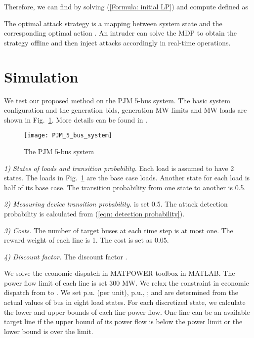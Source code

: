 \documentclass[conference,letterpaper,10pt]{IEEEtran}
\begin{document}
Therefore, we can find  by solving   (\ref{Formula: initial LP}) 
and compute  defined as 

 The optimal attack strategy is a mapping between system state  and the corresponding optimal action . An intruder can solve the MDP to obtain the strategy offline and then inject attacks accordingly in real-time operations.


\section{Simulation}\label{sec:simu}
We test our proposed method on the PJM 5-bus system. The basic system configuration and the generation bids, generation MW limits and MW loads are shown in Fig.~\ref{fig: PJM 5-bus system}. More details can be found in \cite{LR10}.
\vspace{-2mm}
\begin{figure}[h]
	\centering
\texttt{[image: PJM\_5\_bus\_system]}
	\caption{The PJM 5-bus system } \vspace{-3mm}
	\label{fig: PJM 5-bus system}
\end{figure}

\noindent\textit{1) States of loads and transition probability.}
Each load is assumed to have 2 states. The loads in Fig.~\ref{fig: PJM 5-bus system} are the base case loads. Another state for each load is half of its base case. The transition probability from one state to another is 0.5. 

\noindent\textit{2) Measuring device transition probability.}
 is set 0.5. The attack detection probability is calculated from (\ref{eqn: detection probability}).

\noindent\textit{3) Costs.}
 The number of target buses at each time step is at most one. The reward weight of each line is 1. The cost  is set as 0.05.

\noindent\textit{4) Discount factor.}
The discount factor .

We solve the economic dispatch in MATPOWER toolbox in MATLAB. The power flow limit of each line is set 300 MW. We relax the constraint in economic dispatch from  to . We set  p.u. (per unit),  p.u., ;  and  are determined from the actual values of bus  in eight load states.  For each discretized state, we calculate the lower and upper bounds of each line power flow. One line can be an available target line if the upper bound of its power flow is below the power limit or the lower bound is over the limit.
\end{document}

